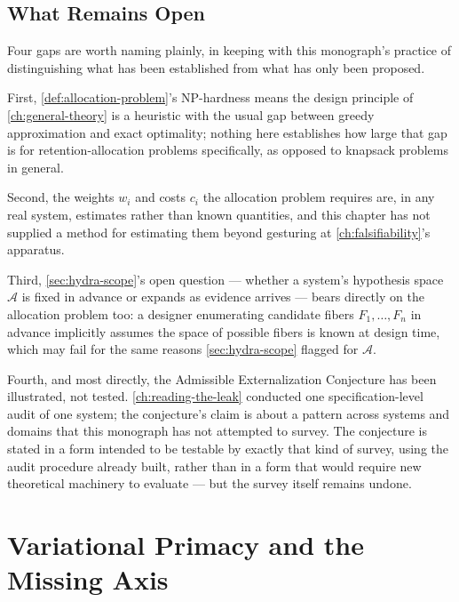 \documentclass[11pt]{book}
\theoremstyle{plain}
\theoremstyle{definition}
\theoremstyle{remark}
\begin{document}
\section{What Remains Open}
\label{sec:general-open}

Four gaps are worth naming plainly, in keeping with this monograph's
practice of distinguishing what has been established from what has
only been proposed.

First, \cref{def:allocation-problem}'s NP-hardness means the design
principle of \cref{ch:general-theory} is a heuristic with the usual
gap between greedy approximation and exact optimality; nothing here
establishes how large that gap is for retention-allocation problems
specifically, as opposed to knapsack problems in general.

Second, the weights $w_i$ and costs $c_i$ the allocation problem
requires are, in any real system, estimates rather than known
quantities, and this chapter has not supplied a method for estimating
them beyond gesturing at \cref{ch:falsifiability}'s apparatus.

Third, \cref{sec:hydra-scope}'s open question --- whether a system's
hypothesis space $\mathcal{A}$ is fixed in advance or expands as
evidence arrives --- bears directly on the allocation problem too: a
designer enumerating candidate fibers $F_1, \dots, F_n$ in advance
implicitly assumes the space of possible fibers is known at design
time, which may fail for the same reasons \cref{sec:hydra-scope}
flagged for $\mathcal{A}$.

Fourth, and most directly, the Admissible Externalization Conjecture
has been illustrated, not tested. \cref{ch:reading-the-leak} conducted
one specification-level audit of one system; the conjecture's claim is
about a pattern across systems and domains that this monograph has not
attempted to survey. The conjecture is stated in a form intended to
be testable by exactly that kind of survey, using the audit procedure
already built, rather than in a form that would require new
theoretical machinery to evaluate --- but the survey itself remains
undone.
\chapter{Variational Primacy and the Missing Axis}
\label{ch:variational-primacy}
\end{document}
